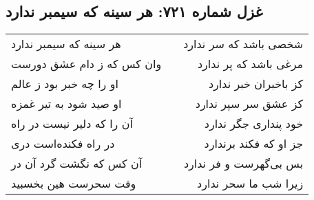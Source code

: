 \begin{center}
\section*{غزل شماره ۷۲۱: هر سینه که سیمبر ندارد}
\label{sec:0721}
\begin{longtable}{l p{0.5cm} r}
هر سینه که سیمبر ندارد
&&
شخصی باشد که سر ندارد
\\
وان کس که ز دام عشق دورست
&&
مرغی باشد که پر ندارد
\\
او را چه خبر بود ز عالم
&&
کز باخبران خبر ندارد
\\
او صید شود به تیر غمزه
&&
کز عشق سر سپر ندارد
\\
آن را که دلیر نیست در راه
&&
خود پنداری جگر ندارد
\\
در راه فکنده‌است دری
&&
جز او که فکند برندارد
\\
آن کس که نگشت گرد آن در
&&
بس بی‌گهرست و فر ندارد
\\
وقت سحرست هین بخسبید
&&
زیرا شب ما سحر ندارد
\\
\end{longtable}
\end{center}
